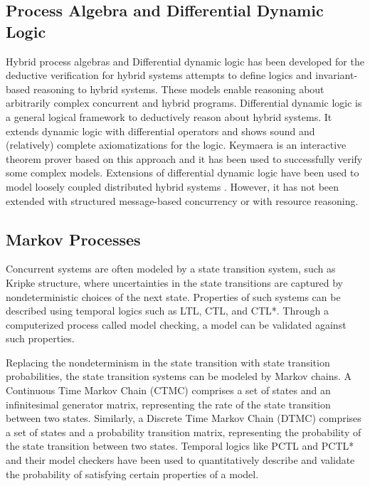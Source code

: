 \documentclass[
graybox,
envcountchap
]{svmult}
\begin{document}
\begin{bibunit}

    \subsection{Process Algebra and Differential Dynamic Logic}

Hybrid process algebras \cite{RoundsS03,BERGSTRA2005215,10.1007/978-3-319-53733-7_8,DBLP:conf/case/CampbellTLPOF16} and Differential dynamic logic \cite{PlatzerBook,Platzer18,PlatzerT18} has been developed for the deductive verification for hybrid systems attempts to define logics and invariant-based reasoning to hybrid systems.
These models enable reasoning about arbitrarily complex concurrent and hybrid programs.
Differential dynamic logic is a general logical framework to deductively reason about hybrid systems.
It extends dynamic logic with differential operators and shows sound and (relatively) complete axiomatizations for the logic.
Keymaera \cite{QueselMLAP16} is an interactive theorem prover based on this approach and it has been used to successfully verify some complex models.
Extensions of differential dynamic logic have been used to model loosely coupled distributed hybrid systems \cite{Platzer12}.
However, it has not been extended with structured message-based concurrency or with resource reasoning.


    \subsection{Markov Processes}

Concurrent systems are often modeled by a state transition system, such as Kripke structure, where uncertainties in the state transitions are captured by nondeterministic choices of the next state. Properties of such systems can be described using temporal logics such as LTL, CTL, and CTL*. Through a computerized process called model checking, a model can be validated against such properties.

Replacing the nondeterminism in the state transition with state transition probabilities, the state transition systems can be modeled by Markov chains. A Continuous Time Markov Chain (CTMC) comprises a set of states and an infinitesimal generator matrix, representing the rate of the state transition between two states. Similarly, a Discrete Time Markov Chain (DTMC) comprises a set of states and a probability transition matrix, representing the probability of the state transition between two states. Temporal logics like PCTL and PCTL* and their model checkers have been used to quantitatively describe and validate the probability of satisfying certain properties of a model.


\end{bibunit}
\end{document}
